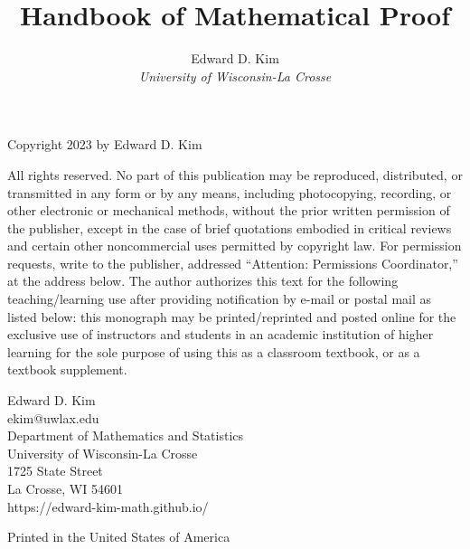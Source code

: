 \documentclass{book}
\theoremstyle{ekimcustom}
\begin{document}
\frontmatter

\title{Handbook of Mathematical Proof}
\author{Edward D. Kim\\\sl{University of Wisconsin-La Crosse}}

\maketitle


\noindent
Copyright \textcopyright{} 2023 by Edward D. Kim

\vskip24pt\noindent
All rights reserved. No part of this publication may be reproduced, distributed, or transmitted in any form or by any means, including photocopying, recording, or other electronic or mechanical methods, without the prior written permission of the publisher, except in the case of brief quotations embodied in critical reviews and certain other noncommercial uses permitted by copyright law. For permission requests, write to the publisher, addressed ``Attention: Permissions Coordinator,'' at the address below. The author authorizes this text for the following teaching/learning use after providing notification by e-mail or postal mail as listed below: this monograph may be printed/reprinted and posted online for the exclusive use of instructors and students in an academic institution of higher learning for the sole purpose of using this as a classroom textbook, or as a textbook supplement.

\vfill

\vskip24pt\noindent
Edward D. Kim\\
ekim@uwlax.edu\\
Department of Mathematics and Statistics\\
University of Wisconsin-La Crosse\\
1725 State Street\\
La Crosse, WI 54601\\
https://edward-kim-math.github.io/


\vskip24pt\noindent
Printed in the United States of America
\end{document}
